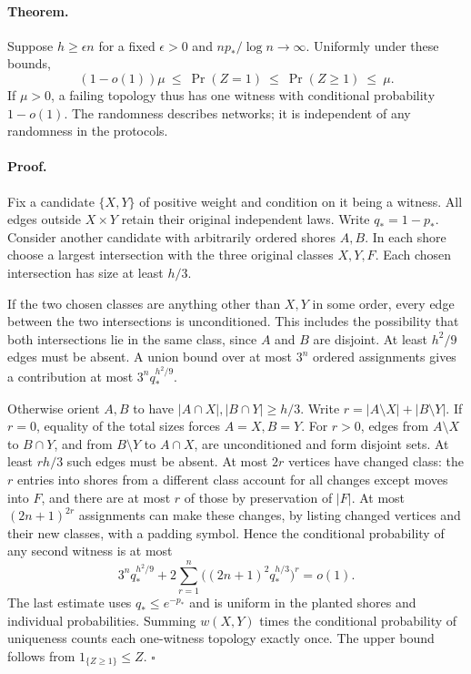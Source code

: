 \documentclass[11pt]{article}
\begin{document}
\paragraph{Theorem.} Suppose $h\ge\epsilon n$ for a fixed $\epsilon>0$ and $np_*/\log n\to\infty$. Uniformly under these bounds,
\[
        (1-o(1))\mu\ \le\ \Pr(Z=1)\ \le\
        \Pr(Z\ge1)\ \le\ \mu .
\]
If $\mu>0$, a failing topology thus has one witness with conditional probability $1-o(1)$. The randomness describes networks; it is independent of any randomness in the protocols.

\paragraph{Proof.}
Fix a candidate $\{X,Y\}$ of positive weight and condition on it being a witness. All edges outside $X\times Y$ retain their original independent laws. Write $q_*=1-p_*$. Consider another candidate with arbitrarily ordered shores $A,B$. In each shore choose a largest intersection with the three original classes $X,Y,F$. Each chosen intersection has size at least $h/3$.

If the two chosen classes are anything other than $X,Y$ in some order, every edge between the two intersections is unconditioned. This includes the possibility that both intersections lie in the same class, since $A$ and $B$ are disjoint. At least $h^2/9$ edges must be absent. A union bound over at most $3^n$ ordered assignments gives a contribution at most $3^n q_*^{h^2/9}$.

Otherwise orient $A,B$ to have $|A\cap X|,|B\cap Y|\ge h/3$. Write $r=|A\setminus X|+|B\setminus Y|$. If $r=0$, equality of the total sizes forces $A=X,B=Y$. For $r>0$, edges from $A\setminus X$ to $B\cap Y$, and from $B\setminus Y$ to $A\cap X$, are unconditioned and form disjoint sets. At least $rh/3$ such edges must be absent. At most $2r$ vertices have changed class: the $r$ entries into shores from a different class account for all changes except moves into $F$, and there are at most $r$ of those by preservation of $|F|$. At most $(2n+1)^{2r}$ assignments can make these changes, by listing changed vertices and their new classes, with a padding symbol. Hence the conditional probability of any second witness is at most
\[
   3^n q_*^{h^2/9}
   +2\sum_{r=1}^{n}\big((2n+1)^2q_*^{h/3}\big)^r=o(1).
\]
The last estimate uses $q_*\le e^{-p_*}$ and is uniform in the planted shores and individual probabilities. Summing $w(X,Y)$ times the conditional probability of uniqueness counts each one-witness topology exactly once. The upper bound follows from $1_{\{Z\ge1\}}\le Z$. \hfill$\square$
\end{document}
